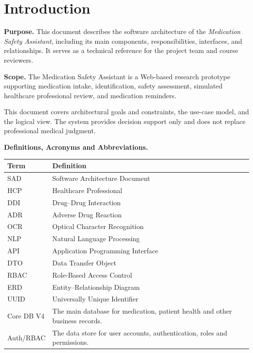 
\section{Introduction}
\label{sec:introduction}

\noindent\textbf{Purpose.}
This document describes the software architecture of the
\emph{Medication Safety Assistant}, including its main components,
responsibilities, interfaces, and relationships. It serves as
a technical reference for the project team and course reviewers.

\medskip
\noindent\textbf{Scope.}
The Medication Safety Assistant is a Web-based research prototype
supporting medication intake, identification, safety assessment,
simulated healthcare professional review, and medication reminders.

This document covers architectural goals and constraints,
the use-case model, and the logical view. The system provides
decision support only and does not replace professional medical
judgment. 



\medskip
\noindent\textbf{Definitions, Acronyms and Abbreviations.}

\noindent
\begin{tabularx}{\textwidth}{|L{2.8cm}|Y|}
    \hline
    \textbf{Term} & \textbf{Definition} \\ \hline
    SAD & Software Architecture Document \\ \hline
    HCP & Healthcare Professional \\ \hline
    DDI & Drug--Drug Interaction \\ \hline
    ADR & Adverse Drug Reaction \\ \hline
    OCR & Optical Character Recognition \\ \hline
    NLP & Natural Language Processing \\ \hline
    API & Application Programming Interface \\ \hline
    DTO & Data Transfer Object \\ \hline
    RBAC & Role-Based Access Control \\ \hline
    ERD & Entity--Relationship Diagram \\ \hline
    UUID & Universally Unique Identifier \\ \hline
    Core DB V4 & The main database for medication,
    patient health and other business records. \\ \hline
    Auth/RBAC & The data store for user accounts,
    authentication, roles and permissions. \\ \hline
\end{tabularx}



